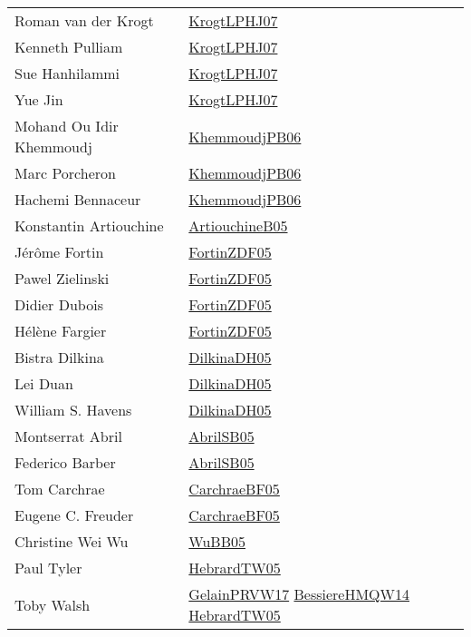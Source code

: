 {\begin{longtable}{p{4cm}p{15cm}}
Roman van der Krogt & \href{papers/KrogtLPHJ07.pdf}{KrogtLPHJ07}\cite{KrogtLPHJ07} \\
Kenneth Pulliam & \href{papers/KrogtLPHJ07.pdf}{KrogtLPHJ07}\cite{KrogtLPHJ07} \\
Sue Hanhilammi & \href{papers/KrogtLPHJ07.pdf}{KrogtLPHJ07}\cite{KrogtLPHJ07} \\
Yue Jin & \href{papers/KrogtLPHJ07.pdf}{KrogtLPHJ07}\cite{KrogtLPHJ07} \\
Mohand Ou Idir Khemmoudj & \href{papers/KhemmoudjPB06.pdf}{KhemmoudjPB06}\cite{KhemmoudjPB06} \\
Marc Porcheron & \href{papers/KhemmoudjPB06.pdf}{KhemmoudjPB06}\cite{KhemmoudjPB06} \\
Hachemi Bennaceur & \href{papers/KhemmoudjPB06.pdf}{KhemmoudjPB06}\cite{KhemmoudjPB06} \\
Konstantin Artiouchine & \href{papers/ArtiouchineB05.pdf}{ArtiouchineB05}\cite{ArtiouchineB05} \\
J{\'{e}}r{\^{o}}me Fortin & \href{papers/FortinZDF05.pdf}{FortinZDF05}\cite{FortinZDF05} \\
Pawel Zielinski & \href{papers/FortinZDF05.pdf}{FortinZDF05}\cite{FortinZDF05} \\
Didier Dubois & \href{papers/FortinZDF05.pdf}{FortinZDF05}\cite{FortinZDF05} \\
H{\'{e}}l{\`{e}}ne Fargier & \href{papers/FortinZDF05.pdf}{FortinZDF05}\cite{FortinZDF05} \\
Bistra Dilkina & \href{papers/DilkinaDH05.pdf}{DilkinaDH05}\cite{DilkinaDH05} \\
Lei Duan & \href{papers/DilkinaDH05.pdf}{DilkinaDH05}\cite{DilkinaDH05} \\
William S. Havens & \href{papers/DilkinaDH05.pdf}{DilkinaDH05}\cite{DilkinaDH05} \\
Montserrat Abril & \href{papers/AbrilSB05.pdf}{AbrilSB05}\cite{AbrilSB05} \\
Federico Barber & \href{papers/AbrilSB05.pdf}{AbrilSB05}\cite{AbrilSB05} \\
Tom Carchrae & \href{papers/CarchraeBF05.pdf}{CarchraeBF05}\cite{CarchraeBF05} \\
Eugene C. Freuder & \href{papers/CarchraeBF05.pdf}{CarchraeBF05}\cite{CarchraeBF05} \\
Christine Wei Wu & \href{papers/WuBB05.pdf}{WuBB05}\cite{WuBB05} \\
Paul Tyler & \href{papers/HebrardTW05.pdf}{HebrardTW05}\cite{HebrardTW05} \\
Toby Walsh & \href{papers/GelainPRVW17.pdf}{GelainPRVW17}\cite{GelainPRVW17} \href{papers/BessiereHMQW14.pdf}{BessiereHMQW14}\cite{BessiereHMQW14} \href{papers/HebrardTW05.pdf}{HebrardTW05}\cite{HebrardTW05} \\

\end{longtable}}
